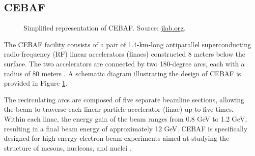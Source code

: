 \subsection{CEBAF}
\label{11.100::cebaf}
    \begin{figure}[b!]
        \centering{}
        \caption[CEBAF.]{Simplified representation of CEBAF.
        Source: \href{https://jlab.org/}{jlab.org}.}
        \label{fig::11.100::cebaf}
    \end{figure}

    The CEBAF facility consists of a pair of 1.4-km-long antiparallel superconducting radio-frequency (RF) linear accelerators (linacs) constructed 8 meters below the surface.
    The two accelerators are connected by two 180-degree arcs, each with a radius of 80 meters \cite{leemann2001}.
    A schematic diagram illustrating the design of CEBAF is provided in Figure \ref{fig::11.100::cebaf}.

    The recirculating arcs are composed of five separate beamline sections, allowing the beam to traverse each linear particle accelerator (linac) up to five times.
    Within each linac, the energy gain of the beam ranges from 0.8 GeV to 1.2 GeV, resulting in a final beam energy of approximately 12 GeV.
    CEBAF is specifically designed for high-energy electron beam experiments aimed at studying the structure of mesons, nucleons, and nuclei \cite{rode2010}.
